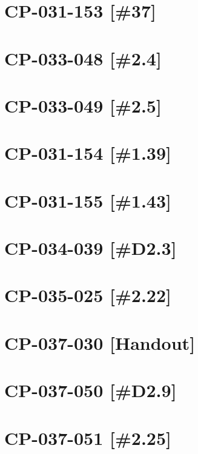 \section{CP-031-153 [\#37]}\newpage

\setcounter{section}{0}

\section{CP-033-048 [\#2.4]}\newpage
\section{CP-033-049 [\#2.5]}\newpage
\section{CP-031-154 [\#1.39]}\newpage
\section{CP-031-155 [\#1.43]}\newpage

\setcounter{section}{0}

\section{CP-034-039 [\#D2.3]}\newpage

\setcounter{section}{0}

\section{CP-035-025 [\#2.22]}\newpage
\section{CP-037-030 [Handout]}\newpage
\section{CP-037-050 [\#D2.9]}\newpage
\section{CP-037-051 [\#2.25]}\newpage

\setcounter{section}{0}

